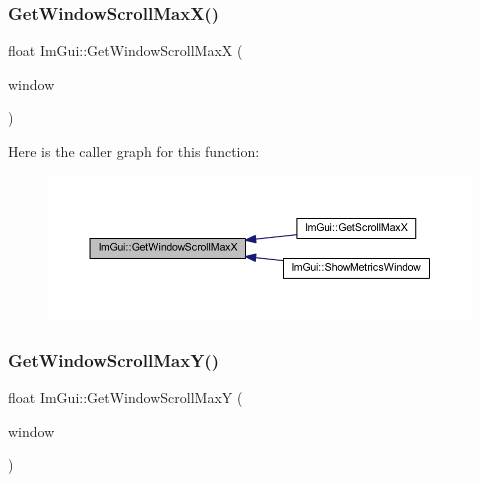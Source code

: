 \mbox{\label{namespace_im_gui_a3675c33f4780febb0ea9801499a4b262}} 
\subsubsection{\texorpdfstring{Get\+Window\+Scroll\+Max\+X()}{GetWindowScrollMaxX()}}
{\footnotesize\ttfamily float Im\+Gui\+::\+Get\+Window\+Scroll\+MaxX (\begin{DoxyParamCaption}\item[{\mbox{\hyperlink{struct_im_gui_window}{Im\+Gui\+Window}} $\ast$}]{window }\end{DoxyParamCaption})}

Here is the caller graph for this function\+:
\nopagebreak
\begin{figure}[H]
\begin{center}
\leavevmode
\includegraphics[width=350pt]{namespace_im_gui_a3675c33f4780febb0ea9801499a4b262_icgraph}
\end{center}
\end{figure}
\mbox{\label{namespace_im_gui_a1016c33aeb30e58a7aa4a66adceed436}} 
\subsubsection{\texorpdfstring{Get\+Window\+Scroll\+Max\+Y()}{GetWindowScrollMaxY()}}
{\footnotesize\ttfamily float Im\+Gui\+::\+Get\+Window\+Scroll\+MaxY (\begin{DoxyParamCaption}\item[{\mbox{\hyperlink{struct_im_gui_window}{Im\+Gui\+Window}} $\ast$}]{window }\end{DoxyParamCaption})}

